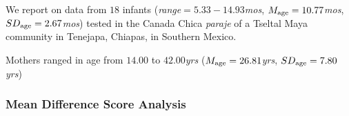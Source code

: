 \documentclass[
  doc,floatsintext]{apa6}
\newenvironment{Shaded}{\begin{snugshade}}{\end{snugshade}}
\newcommand{\AttributeTok}[1]{\textcolor[rgb]{0.13,0.29,0.53}{#1}}
\newcommand{\FunctionTok}[1]{\textcolor[rgb]{0.13,0.29,0.53}{\textbf{#1}}}
\newcommand{\NormalTok}[1]{#1}
\newcommand{\OtherTok}[1]{\textcolor[rgb]{0.56,0.35,0.01}{#1}}
\newcommand{\SpecialCharTok}[1]{\textcolor[rgb]{0.81,0.36,0.00}{\textbf{#1}}}
\begin{document}
\begin{Shaded}
\end{Shaded}

We report on data from \(18\) infants (\textit{range}\(=5.33-14.93\)\textit{mos}, \(M_\textnormal{age}=10.77\)\textit{mos}, \(SD_\textnormal{age}=2.67\)\textit{mos}) tested in the Canada Chica \textit{paraje} of a Tseltal Maya community in Tenejapa, Chiapas, in Southern Mexico.

Mothers ranged in age from \(14.00\) to \(42.00\)\textit{yrs} (\(M_\textnormal{age}=26.81\)\textit{yrs}, \(SD_\textnormal{age}=7.80\)\textit{yrs})

\subsubsection{Mean Difference Score Analysis}\label{mean-difference-score-analysis}
\end{document}

